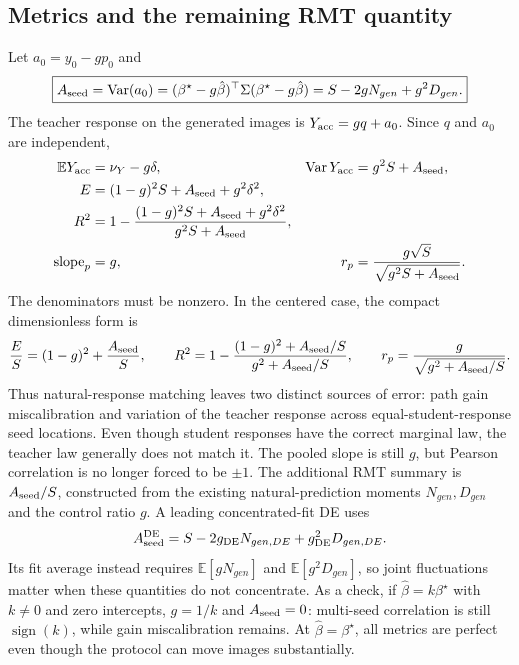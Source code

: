 \documentclass[11pt]{article}
\newcommand{\E}{\mathbb E}
\newcommand{\Var}{\operatorname{Var}}
\newcommand{\bstar}{{\beta^{\star}}}
\newcommand{\bhat}{\hat{\beta}}
\begin{document}
\subsection{Metrics and the remaining RMT quantity}
Let $a_0=y_0-g p_0$ and
\begin{equation}\boxed{
 A_{\rm seed}=\Var(a_0)
  =(\bstar-g\bhat)^\top\Sigma(\bstar-g\bhat)
  =S-2g N_{gen}+g^2D_{gen}.}
 \label{eq:matching-residual}
\end{equation}
The teacher response on the generated images is $Y_{\rm acc}=g q+a_0$.
Since $q$ and $a_0$ are independent,
\begin{align}
 \E Y_{\rm acc}&=\nu_Y-g\delta,&
 \Var Y_{\rm acc}&=g^2S+A_{\rm seed},\\
 E&=(1-g)^2S+A_{\rm seed}+g^2\delta^2,\label{eq:matching-mse}\\
 R^2&=1-\frac{(1-g)^2S+A_{\rm seed}+g^2\delta^2}
                    {g^2S+A_{\rm seed}},\\
 \mathrm{slope}_p&=g,&
 r_p&=\frac{g\sqrt S}{\sqrt{g^2S+A_{\rm seed}}}.
\end{align}
The denominators must be nonzero. In the centered case, the compact dimensionless
form is
\[
 \frac{E}{S}=(1-g)^2+\frac{A_{\rm seed}}S,\qquad
 R^2=1-\frac{(1-g)^2+A_{\rm seed}/S}{g^2+A_{\rm seed}/S},\qquad
 r_p=\frac{g}{\sqrt{g^2+A_{\rm seed}/S}}.
\]
Thus natural-response matching leaves two distinct sources of error: path gain
miscalibration and variation of the teacher response across equal-student-response
seed locations. Even though student responses have the correct marginal law,
the teacher law generally does not match it.
The pooled slope is still $g$, but Pearson correlation is no longer forced to
be $\pm1$. The additional RMT summary is $A_{\rm seed}/S$, constructed from
the existing natural-prediction moments $N_{gen},D_{gen}$ and the control ratio $g$.
A leading concentrated-fit DE uses
\[
 A_{\rm seed}^{\rm DE}=S-2g_{\rm DE}N_{gen,DE}
                         +g_{\rm DE}^2D_{gen,DE}.
\]
Its fit average instead requires $\E[g N_{gen}]$ and $\E[g^2D_{gen}]$, so joint fluctuations
matter when these quantities do not concentrate. As a check, if
$\bhat=k\bstar$ with $k\ne0$ and zero intercepts, $g=1/k$ and
$A_{\rm seed}=0$: multi-seed correlation is still $\operatorname{sign}(k)$,
while gain miscalibration remains. At $\bhat=\bstar$, all metrics are perfect even
though the protocol can move images substantially.
\end{document}
